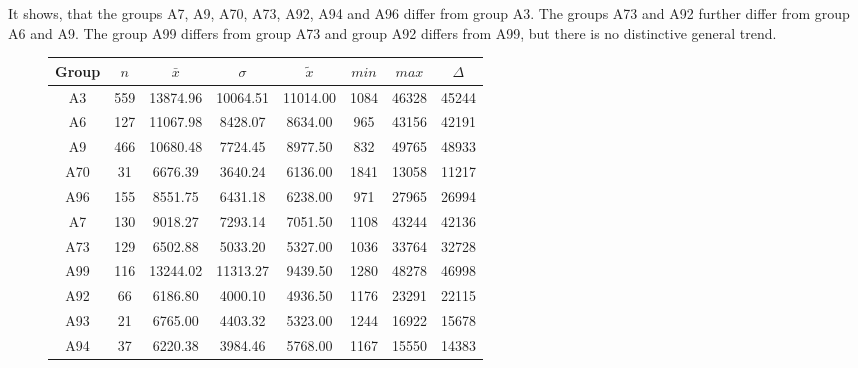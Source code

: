 It shows, that the groups A7, A9, A70, A73, A92, A94 and A96 differ from group A3. The groups A73 and A92 further differ from group A6 and A9. The group A99 differs from group A73 and group A92 differs from A99, but there is no distinctive general trend.
\begin{figure}[ht!]
	\centering
	\begin{minipage}{0.5\textwidth}
		\tiny
		\setlength{\tabcolsep}{4pt}
		\centering
		\begin{tabular}{c|c|c|c|c|c|c|c}
			\toprule
			Group & $n$ & $\bar{x}$ & $\sigma$ & $\tilde{x}$ & $min$ & $max$ & $\Delta$ \\
			\midrule
			A3  & 559 & 13874.96 & 10064.51 & 11014.00 & 1084 & 46328 & 45244 \\ 
			A6  & 127 & 11067.98 & 8428.07  & 8634.00  & 965  & 43156 & 42191 \\ 
			A9  & 466 & 10680.48 & 7724.45  & 8977.50  & 832  & 49765 & 48933 \\ 
			A70 & 31  & 6676.39  & 3640.24  & 6136.00  & 1841 & 13058 & 11217 \\ 
			A96 & 155 & 8551.75  & 6431.18  & 6238.00  & 971  & 27965 & 26994 \\ 
			A7  & 130 & 9018.27  & 7293.14  & 7051.50  & 1108 & 43244 & 42136 \\ 
			A73 & 129 & 6502.88  & 5033.20  & 5327.00  & 1036 & 33764 & 32728 \\ 
			A99 & 116 & 13244.02 & 11313.27 & 9439.50  & 1280 & 48278 & 46998 \\ 
			A92 & 66  & 6186.80  & 4000.10  & 4936.50  & 1176 & 23291 & 22115 \\ 
			A93 & 21  & 6765.00  & 4403.32  & 5323.00  & 1244 & 16922 & 15678 \\ 
			A94 & 37  & 6220.38  & 3984.46  & 5768.00  & 1167 & 15550 & 14383 \\ 
			\bottomrule
		\end{tabular}
		\label{tbl:descriptives_baysis_matched_Str_SMax}
	\end{minipage}%
	\begin{minipage}{0.55\textwidth}
\end{minipage}
\end{figure}
